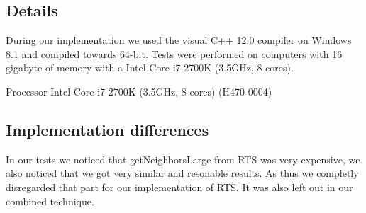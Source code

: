 \documentclass[../../main.tex]{subfiles}
\begin{document}

\subsection{Details}
During our implementation we used the visual C++ 12.0 compiler on Windows 8.1 and compiled towards 64-bit. Tests were performed on computers with 16 gigabyte of memory with a Intel Core i7-2700K (3.5GHz, 8 cores).

Processor Intel Core i7-2700K (3.5GHz, 8 cores) (H470-0004)

\subsection{Implementation differences}
In our tests we noticed that getNeighborsLarge from RTS was very expensive, we also noticed that we got very similar and resonable results. As thus we completly disregarded that part for our implementation of RTS. It was also left out in our combined technique. %
\end{document}

